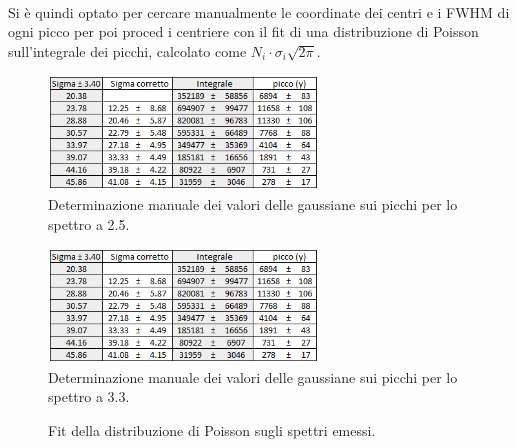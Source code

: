 \documentclass[11pt]{article} %
\begin{document}
\\ Si è quindi optato per cercare manualmente le coordinate dei centri e i FWHM di ogni picco per poi proced i centriere con il fit di una distribuzione di Poisson sull'integrale dei picchi, calcolato come $N_i\cdot\sigma_i \sqrt{2\pi}$. 
\begin{figure}[h!]
\begin{center}
\includegraphics[width=270px]{img/tabp25.PNG}
\caption{Determinazione manuale dei valori delle gaussiane sui picchi per lo spettro a 2.5.}
\label{fig:tabpicchi25}
\end{center}
\end{figure}
\begin{figure}[h!]
\begin{center}
\vspace{-26pt}
\includegraphics[width=270px]{img/tabp25.PNG}
\caption{Determinazione manuale dei valori delle gaussiane sui picchi per lo spettro a 3.3.}
\label{fig:tabpicchi25}
\end{center}
\end{figure}
\newpage
\begin{figure}[!h]
\centering
\caption{Fit della distribuzione di Poisson sugli spettri emessi.}
\end{figure}
\end{document}
